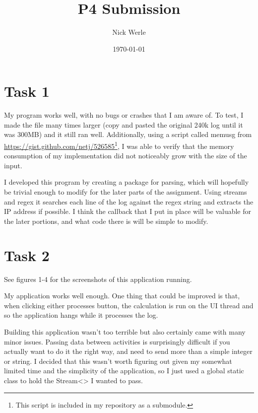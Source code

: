 \documentclass[11pt]{article}
\title{P4 Submission}
\author{Nick Werle}
\date{\today}
\begin{document}
	\maketitle
	\section{Task 1}
	My program works well, with no bugs or crashes that I am aware of. To test, I made the file many times larger (copy and pasted the original 240k log until it was 300MB) and it still ran well. Additionally, using a script called memusg from \url{https://gist.github.com/netj/526585}\footnote{This script is included in my repository as a submodule.}, I was able to verify that the memory consumption of my implementation did not noticeably grow with the size of the input.
	
	I developed this program by creating a package for parsing, which will hopefully be trivial enough to modify for the later parts of the assignment. Using streams and regex it searches each line of the log against the regex string and extracts the IP address if possible. I think the callback that I put in place will be valuable for the later portions, and what code there is will be simple to modify.
	\section{Task 2}
	See figures 1-4 for the screenshots of this application running.
	
	My application works well enough. One thing that could be improved is that, when clicking either processes button, the calculation is run on the UI thread and so the application hangs while it processes the log.
	
	Building this application wasn't too terrible but also certainly came with many minor issues. Passing data between activities is surprisingly difficult if you actually want to do it the right way, and need to send more than a simple integer or string. I decided that this wasn't worth figuring out given my somewhat limited time and the simplicity of the application, so I just used a global static class to hold the Stream<> I wanted to pass.
	
\end{document}
